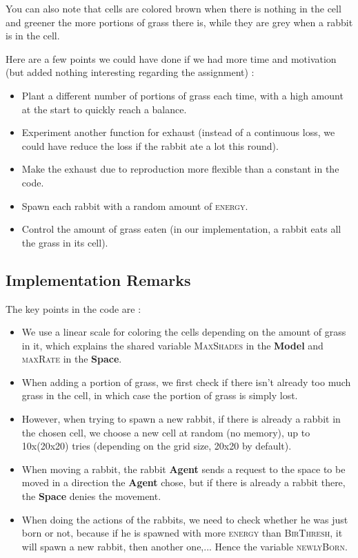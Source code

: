 \documentclass[11pt]{article}
\begin{document}
You can also note that cells are colored brown when there is nothing in the cell and greener the more portions of grass there is, while they are grey when a rabbit is in the cell.

\vspace{5mm}

Here are a few points we could have done if we had more time and motivation (but added nothing interesting regarding the assignment) :

\begin{itemize}
\item Plant a different number of portions of grass each time, with a high amount at the start to quickly reach a balance.
\item Experiment another function for exhaust (instead of a continuous loss, we could have reduce the loss if the rabbit ate a lot this round).
\item Make the exhaust due to reproduction more flexible than a constant in the code.
\item Spawn each rabbit with a random amount of \textsc{energy}.
\item Control the amount of grass eaten (in our implementation, a rabbit eats all the grass in its cell).
\end{itemize}

\subsection{Implementation Remarks}

The key points in the code are :

\begin{itemize}
\item We use a linear scale for coloring the cells depending on the amount of grass in it, which explains the shared variable \textsc{MaxShades} in the \textbf{Model} and \textsc{maxRate} in the \textbf{Space}.
\item When adding a portion of grass, we first check if there isn't already too much grass in the cell, in which case the portion of grass is simply lost.
\item However, when trying to spawn a new rabbit, if there is already a rabbit in the chosen cell, we choose a new cell at random (no memory), up to 10x(20x20) tries (depending on the grid size, 20x20 by default).
\item When moving a rabbit, the rabbit \textbf{Agent} sends a request to the space to be moved in a direction the \textbf{Agent} chose, but if there is already a rabbit there, the \textbf{Space} denies the movement.
\item When doing the actions of the rabbits, we need to check whether he was just born or not, because if he is spawned with more \textsc{energy} than \textsc{BirThresh}, it will spawn a new rabbit, then another one,... Hence the variable \textsc{newlyBorn}.
\end{itemize}
\end{document}
